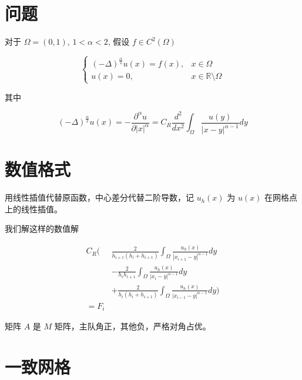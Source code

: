 \documentclass{ctexart}
\begin{document}
\section{问题}

对于 \(\Omega=(0,1)\), \(1<\alpha<2\), 假设 \(f\in C^2(\Omega)\)

\begin{equation}
    \begin{cases}
        (-\Delta)^{\frac{\alpha}{2}} u(x) = f(x), & x \in \Omega                      \\
        u(x) = 0,                                 & x \in \mathbb{R} \setminus \Omega
    \end{cases}
\end{equation}

其中

\begin{equation}
    (-\Delta)^{\frac{\alpha}{2}} u(x) = -\frac{\partial^\alpha u}{\partial |x|^\alpha}
    = C_R \frac{d^2}{dx^2} \int_\Omega \frac{u(y)}{|x-y|^{\alpha-1}} dy
\end{equation}


\section{数值格式}

用线性插值代替原函数，中心差分代替二阶导数，记 \(u_h(x)\) 为 \(u(x)\) 在网格点上的线性插值。

我们解这样的数值解

\begin{equation}
    \begin{aligned}
        C_R ( & \frac{2}{h_{i+1} (h_i + h_{i+1})}\int_\Omega \frac{u_h(x)}{ |x_{i+1}-y|^{\alpha-1} } dy \\
              & -\frac{2}{h_i h_{i+1}}\int_\Omega \frac{u_h(x)}{ |x_i-y|^{\alpha-1} } dy                \\
              & + \frac{2}{h_i (h_i+ h_{i+1})}\int_\Omega \frac{u_h(x)}{ |x_{i-1}-y|^{\alpha-1} } dy
        )                                                                                               \\
        = F_i
    \end{aligned}
\end{equation}


矩阵 \(A\) 是 \(M\) 矩阵，主队角正，其他负，严格对角占优。


\section{一致网格}
\end{document}
